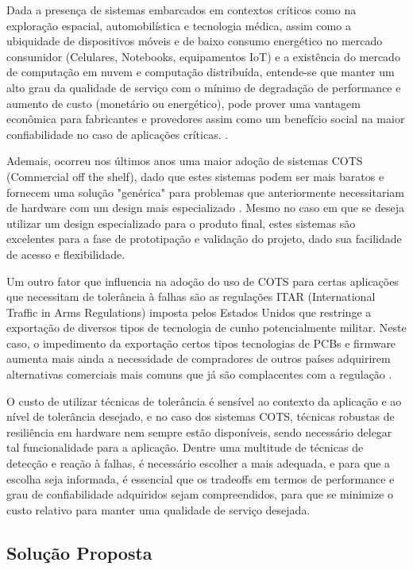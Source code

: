 Dada a presença de sistemas embarcados em contextos críticos como na exploração espacial, automobilística e tecnologia médica, assim como a ubiquidade de dispositivos móveis e de baixo consumo energético no mercado consumidor (Celulares, Notebooks, equipamentos IoT) e a existência do mercado de computação em nuvem e computação distribuída, entende-se que manter um alto grau da qualidade de serviço com o mínimo de degradação de performance e aumento de custo (monetário ou energético), pode prover uma vantagem econômica para fabricantes e provedores assim como um benefício social na maior confiabilidade no caso de aplicações críticas. \cite{DependabilityInEmbeddedSystems}.

Ademais, ocorreu nos últimos anos uma maior adoção de sistemas COTS (Commercial off the shelf), dado que estes sistemas podem ser mais baratos e fornecem uma solução "genérica" para problemas que anteriormente necessitariam de hardware com um design mais especializado \cite{CyberSecSpaceCOTS}. Mesmo no caso em que se deseja utilizar um design especializado para o produto final, estes sistemas são excelentes para a fase de prototipação e validação do projeto, dado sua facilidade de acesso e flexibilidade.

Um outro fator que influencia na adoção do uso de COTS para certas aplicações que necessitam de tolerância à falhas são as regulações ITAR (International Traffic in Arms Regulations) imposta pelos Estados Unidos que restringe a exportação de diversos tipos de tecnologia de cunho potencialmente militar. Neste caso, o impedimento da exportação certos tipos  tecnologias de PCBs e firmware aumenta mais ainda a necessidade de compradores de outros países adquirirem alternativas comerciais mais comuns que já são complacentes com a regulação \cite{ITARPCBCompliance}.

O custo de utilizar técnicas de tolerância é sensível ao contexto da aplicação e ao nível de tolerância desejado, e no caso dos sistemas COTS, técnicas robustas de resiliência em hardware nem sempre estão disponíveis, sendo necessário delegar tal funcionalidade para a aplicação. Dentre uma multitude de técnicas de detecção e reação à falhas, é necessário escolher a mais adequada, e para que a escolha seja informada, é essencial que os tradeoffs em termos de performance e grau de confiabilidade adquiridos sejam compreendidos, para que se minimize o custo relativo para manter uma qualidade de serviço desejada.

\subsection{Solução Proposta}

